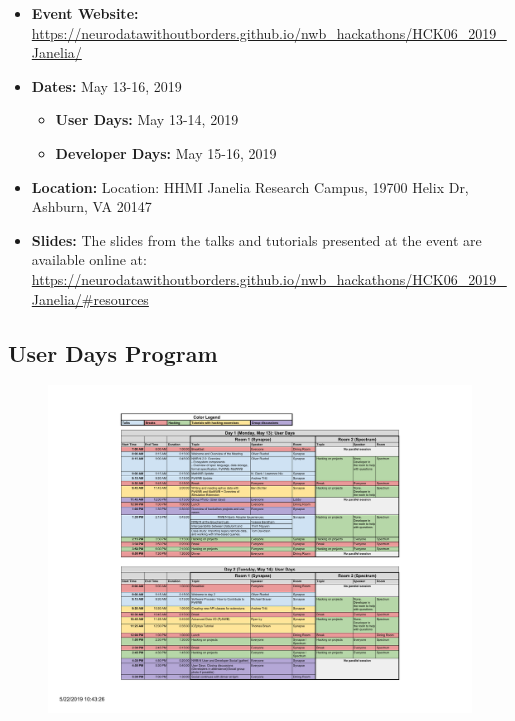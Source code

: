 \documentclass{article}
\begin{document}
\begin{itemize}
  \item \textbf{Event Website:} \href{https://neurodatawithoutborders.github.io/nwb_hackathons/HCK06\_2019\_Janelia/}{https://neurodatawithoutborders.github.io/nwb\_hackathons/HCK06\_2019\_Janelia/}
  \item \textbf{Dates:} May 13-16, 2019
  \begin{itemize}
     \setlength\itemsep{0cm}
      \item \textbf{User Days:} May 13-14, 2019
      \item \textbf{Developer Days:} May 15-16, 2019
    \end{itemize}
  \item \textbf{Location:}  Location: HHMI Janelia Research Campus, 19700 Helix Dr, Ashburn, VA 20147
  \item \textbf{Slides:} The slides from the talks and tutorials presented at the event are available online at: \\ \href{https://neurodatawithoutborders.github.io/nwb\_hackathons/HCK06\_2019\_Janelia/\#resources}{https://neurodatawithoutborders.github.io/nwb\_hackathons/HCK06\_2019\_Janelia/\#resources}
\end{itemize}


\subsection{User Days Program}
\label{sec:program:userdays}
\begin{figure}[h!]
\includegraphics[width=\textwidth]{figures/agenda_user_days.pdf}
\end{figure}
\end{document}
